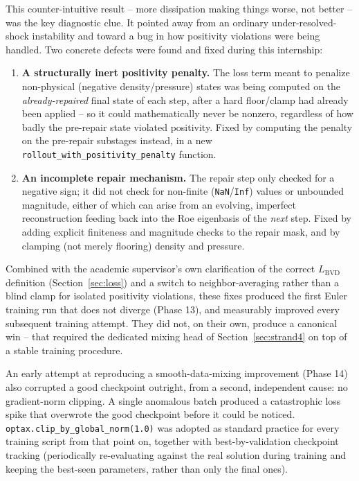 \documentclass[11pt]{article}
\begin{document}
This counter-intuitive result -- more dissipation making things worse, not
better -- was the key diagnostic clue. It pointed away from an ordinary
under-resolved-shock instability and toward a bug in how positivity
violations were being handled. Two concrete defects were found and fixed
during this internship:

\begin{enumerate}
    \item \textbf{A structurally inert positivity penalty.} The loss term
    meant to penalize non-physical (negative density/pressure) states was
    being computed on the \emph{already-repaired} final state of each
    step, after a hard floor/clamp had already been applied -- so it could
    mathematically never be nonzero, regardless of how badly the
    pre-repair state violated positivity. Fixed by computing the penalty
    on the pre-repair substages instead, in a new
    \texttt{rollout\_with\_\allowbreak positivity\_\allowbreak penalty}
    function.
    \item \textbf{An incomplete repair mechanism.} The repair step only
    checked for a negative sign; it did not check for non-finite
    (\texttt{NaN}/\texttt{Inf}) values or unbounded magnitude, either of
    which can arise from an evolving, imperfect reconstruction feeding back
    into the Roe eigenbasis of the \emph{next} step. Fixed by adding
    explicit finiteness and magnitude checks to the repair mask, and by
    clamping (not merely flooring) density and pressure.
\end{enumerate}

Combined with the academic supervisor's own clarification of the correct
$L_{\text{BVD}}$ definition (Section~\ref{sec:loss}) and a switch to
neighbor-averaging rather than a blind clamp for isolated positivity
violations, these fixes produced the first Euler training run that does
not diverge (Phase 13), and measurably improved every subsequent training
attempt. They did not, on their own, produce a canonical win -- that
required the dedicated mixing head of Section~\ref{sec:strand4} on top of
a stable training procedure.

An early attempt at reproducing a smooth-data-mixing improvement
(Phase 14) also corrupted a good checkpoint outright, from a second,
independent cause: no gradient-norm clipping. A single anomalous batch
produced a catastrophic loss spike that overwrote the good checkpoint
before it could be noticed. \texttt{optax.clip\_by\_global\_norm(1.0)} was
adopted as standard practice for every training script from that point on,
together with best-by-validation checkpoint tracking (periodically
re-evaluating against the real solution during training and keeping the
best-seen parameters, rather than only the final ones).
\end{document}
